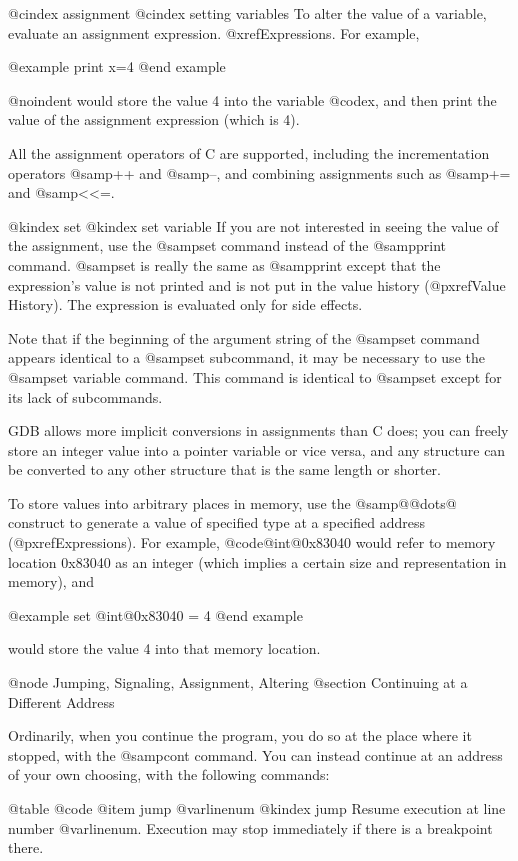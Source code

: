 @cindex assignment
@cindex setting variables
To alter the value of a variable, evaluate an assignment expression.
@xref{Expressions}.  For example,

@example
print x=4
@end example

@noindent
would store the value 4 into the variable @code{x}, and then print
the value of the assignment expression (which is 4).

All the assignment operators of C are supported, including the
incrementation operators @samp{++} and @samp{--}, and combining
assignments such as @samp{+=} and @samp{<<=}.

@kindex set
@kindex set variable
If you are not interested in seeing the value of the assignment, use the
@samp{set} command instead of the @samp{print} command.  @samp{set} is
really the same as @samp{print} except that the expression's value is not
printed and is not put in the value history (@pxref{Value History}).  The
expression is evaluated only for side effects.

Note that if the beginning of the argument string of the @samp{set} command
appears identical to a @samp{set} subcommand, it may be necessary to use
the @samp{set variable} command.  This command is identical to @samp{set}
except for its lack of subcommands.

GDB allows more implicit conversions in assignments than C does; you can
freely store an integer value into a pointer variable or vice versa, and
any structure can be converted to any other structure that is the same
length or shorter.

To store values into arbitrary places in memory, use the @samp{@{@dots{}@}}
construct to generate a value of specified type at a specified address
(@pxref{Expressions}).  For example, @code{@{int@}0x83040} would refer
to memory location 0x83040 as an integer (which implies a certain size
and representation in memory), and

@example
set @{int@}0x83040 = 4
@end example

would store the value 4 into that memory location.

@node Jumping, Signaling, Assignment, Altering
@section Continuing at a Different Address

Ordinarily, when you continue the program, you do so at the place where
it stopped, with the @samp{cont} command.  You can instead continue at
an address of your own choosing, with the following commands:

@table @code
@item jump @var{linenum}
@kindex jump
Resume execution at line number @var{linenum}.  Execution may stop
immediately if there is a breakpoint there.

